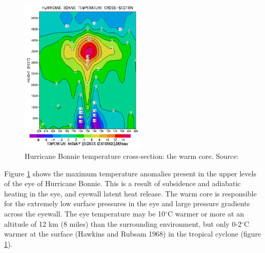 \begin{figure}[h]
	\centering
	\noindent\includegraphics[width=14pc,angle=0]{warm_core2.png}
	\caption{Hurricane Bonnie temperature cross-section: the warm core. Source: \cite{eastin}}\label{fig:warm_core}
\end{figure}

Figure \ref{fig:warm_core} shows the maximum temperature anomalies present in the upper levels of the eye of Hurricane Bonnie. This is a result of subsidence and adiabatic heating in the eye, and eyewall latent heat release. The warm core is responsible for the extremely low surface pressures in the eye and large pressure gradients across the eyewall. The eye temperature may be 10$^{\circ}$C warmer or more at an altitude of 12 km (8 miles) than the surrounding environment, but only 0-2$^{\circ}$C warmer at the surface (Hawkins and Rubsam 1968) in the tropical cyclone (figure \ref{fig:warm_core}).

